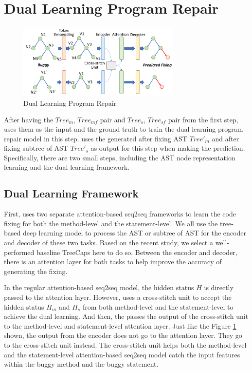 \section{Dual Learning Program Repair}

\begin{figure}[t]
	\centering
	\includegraphics[width=3.2in]{graphs/program_repair.png}
	\caption{Dual Learning Program Repair}
	\label{program-repair}
\end{figure}

After having the $Tree_m$, $Tree_{mf}$ pair and $Tree_s$, $Tree_{sf}$ pair from the first step, \tool uses them as the input and the ground truth to train the dual learning program repair model in this step. \tool uses the generated after fixing AST $Tree'_m$ and after fixing subtree of AST $Tree'_s$ as output for this step when making the prediction. Specifically, there are two small steps, including the AST node representation learning and the dual learning framework.




\subsection{Dual Learning Framework}

First, \tool uses two separate attention-based seq2seq frameworks to learn the code fixing for both the method-level and the statement-level. We all use the tree-based deep learning model to process the AST or subtree of AST for the encoder and decoder of these two tasks. Based on the recent study, we select a well-performed baseline TreeCaps \cite{bui2021treecaps} here to do so. Between the encoder and decoder, there is an attention layer for both tasks to help improve the accuracy of generating the fixing.

In the regular attention-based seq2seq model, the hidden status $H$ is directly passed to the attention layer. However, \tool uses a cross-stitch unit to accept the hidden status $H_m$ and $H_s$ from both method-level and the statement-level to achieve the dual learning. And then, the \tool passes the output of the cross-stitch unit to the method-level and statement-level attention layer. Just like the Figure \ref{program-repair} shown, the output from the encoder does not go to the attention layer. They go to the cross-stitch unit instead. The cross-stitch unit helps both the method-level and the statement-level attention-based seq2seq model catch the input features within the buggy method and the buggy statement.

